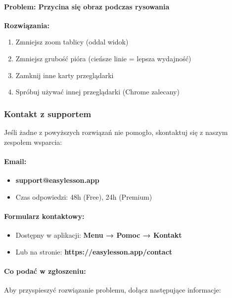 \documentclass[12pt,a4paper]{article}
\begin{document}
\paragraph{Problem: Przycina się obraz podczas rysowania}

\textbf{Rozwiązania:}

\begin{enumerate}
    \item Zmniejsz zoom tablicy (oddal widok)
    \item Zmniejsz grubość pióra (cieńsze linie = lepsza wydajność)
    \item Zamknij inne karty przeglądarki
    \item Spróbuj używać innej przeglądarki (Chrome zalecany)
\end{enumerate}

\subsubsection{Kontakt z supportem}

Jeśli żadne z powyższych rozwiązań nie pomogło, skontaktuj się z naszym zespołem wsparcia:

\paragraph{Email:}
\begin{itemize}
    \item \textbf{support@easylesson.app}
    \item Czas odpowiedzi: 48h (Free), 24h (Premium)
\end{itemize}

\paragraph{Formularz kontaktowy:}
\begin{itemize}
    \item Dostępny w aplikacji: \textbf{Menu → Pomoc → Kontakt}
    \item Lub na stronie: \textbf{https://easylesson.app/contact}
\end{itemize}

\paragraph{Co podać w zgłoszeniu:}

Aby przyspieszyć rozwiązanie problemu, dołącz następujące informacje:
\end{document}
